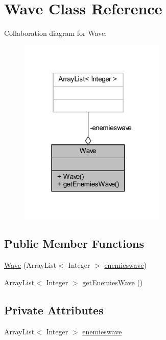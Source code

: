 \hypertarget{classevents_1_1_wave}{}\section{Wave Class Reference}
\label{classevents_1_1_wave}


Collaboration diagram for Wave\+:\nopagebreak
\begin{figure}[H]
\begin{center}
\leavevmode
\includegraphics[width=198pt]{classevents_1_1_wave__coll__graph}
\end{center}
\end{figure}
\subsection*{Public Member Functions}
\begin{DoxyCompactItemize}
\item 
\hyperlink{classevents_1_1_wave_a43d1aadca6968f6a8b718880fd19aaa4}{Wave} (Array\+List$<$ Integer $>$ \hyperlink{classevents_1_1_wave_af2cde6170a7bb973c8a1b5851deaa0e5}{enemieswave})
\item 
Array\+List$<$ Integer $>$ \hyperlink{classevents_1_1_wave_a196ea1965f3292364029770fc56b2dbc}{get\+Enemies\+Wave} ()
\end{DoxyCompactItemize}
\subsection*{Private Attributes}
\begin{DoxyCompactItemize}
\item 
Array\+List$<$ Integer $>$ \hyperlink{classevents_1_1_wave_af2cde6170a7bb973c8a1b5851deaa0e5}{enemieswave}
\end{DoxyCompactItemize}


